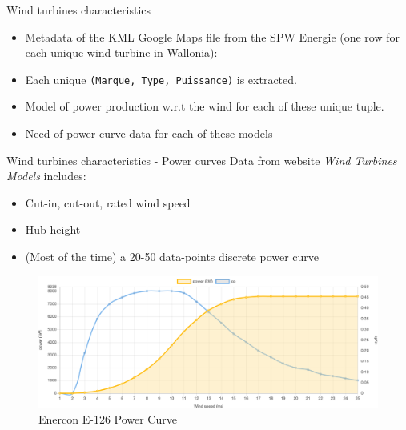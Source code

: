 \documentclass[12pt]{beamer}
\begin{document}
\begin{frame}{Wind turbines characteristics}
    \begin{itemize}
        \item Metadata of the KML Google Maps file from the SPW Energie (one row for each unique wind turbine in Wallonia):
    
        \item Each unique \texttt{(Marque, Type, Puissance)} is extracted.
        
        \item \alert{Model of power production} w.r.t the \alert{wind} for each of these unique tuple.
        
        \item Need of \alert{power curve} data for each of these models
    \end{itemize}
\end{frame}

\begin{frame}{Wind turbines characteristics - Power curves}
    Data from website \textit{Wind Turbines Models} \cite{wind-turbine-models} includes:
    \begin{itemize}
        \item Cut-in, cut-out, rated wind speed
        \item Hub height
        \item (Most of the time) a 20-50 data-points discrete power curve
    \end{itemize}
    \begin{figure}
        \centering
        \includegraphics[width=.5\textwidth]{resources/png/power_curve.png}
        \caption*{Enercon E-126 Power Curve}
        \label{fig:my_label}
    \end{figure}
\end{frame}
\end{document}
